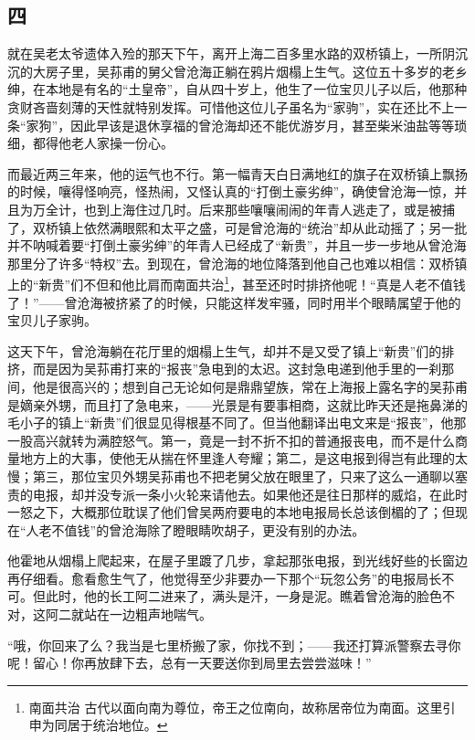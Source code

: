 \subsection*{四}

\par 就在吴老太爷遗体入殓的那天下午，离开上海二百多里水路的双桥镇上，一所阴沉沉的大房子里，吴荪甫的舅父曾沧海正躺在鸦片烟榻上生气。这位五十多岁的老乡绅，在本地是有名的“土皇帝”，自从四十岁上，他生了一位宝贝儿子以后，他那种贪财吝啬刻薄的天性就特别发挥。可惜他这位儿子虽名为“家驹”，实在还比不上一条“家狗”，因此早该是退休享福的曾沧海却还不能优游岁月，甚至柴米油盐等等琐细，都得他老人家操一份心。
\par 而最近两三年来，他的运气也不行。第一幅青天白日满地红的旗子在双桥镇上飘扬的时候，嚷得怪响亮，怪热闹，又怪认真的“打倒土豪劣绅”，确使曾沧海一惊，并且为万全计，也到上海住过几时。后来那些嚷嚷闹闹的年青人逃走了，或是被捕了，双桥镇上依然满眼熙和太平之盛，可是曾沧海的“统治”却从此动摇了；另一批并不呐喊着要“打倒土豪劣绅”的年青人已经成了“新贵”，并且一步一步地从曾沧海那里分了许多“特权”去。到现在，曾沧海的地位降落到他自己也难以相信：双桥镇上的“新贵”们不但和他比肩而南面共治\footnote{南面共治 古代以面向南为尊位，帝王之位南向，故称居帝位为南面。这里引申为同居于统治地位。}，甚至还时时排挤他呢！“真是人老不值钱了！”——曾沧海被挤紧了的时候，只能这样发牢骚，同时用半个眼睛属望于他的宝贝儿子家驹。
\par 这天下午，曾沧海躺在花厅里的烟榻上生气，却并不是又受了镇上“新贵”们的排挤，而是因为吴荪甫打来的“报丧”急电到的太迟。这封急电递到他手里的一刹那间，他是很高兴的；想到自己无论如何是鼎鼎望族，常在上海报上露名字的吴荪甫是嫡亲外甥，而且打了急电来，——光景是有要事相商，这就比昨天还是拖鼻涕的毛小子的镇上“新贵”们很显见得根基不同了。但当他翻译出电文来是“报丧”，他那一股高兴就转为满腔怒气。第一，竟是一封不折不扣的普通报丧电，而不是什么商量地方上的大事，使他无从揣在怀里逢人夸耀；第二，是这电报到得岂有此理的太慢；第三，那位宝贝外甥吴荪甫也不把老舅父放在眼里了，只来了这么一通聊以塞责的电报，却并没专派一条小火轮来请他去。如果他还是往日那样的威焰，在此时一怒之下，大概那位耽误了他们曾吴两府要电的本地电报局长总该倒楣的了；但现在“人老不值钱”的曾沧海除了瞪眼睛吹胡子，更没有别的办法。
\par 他霍地从烟榻上爬起来，在屋子里踱了几步，拿起那张电报，到光线好些的长窗边再仔细看。愈看愈生气了，他觉得至少非要办一下那个“玩忽公务”的电报局长不可。但此时，他的长工阿二进来了，满头是汗，一身是泥。瞧着曾沧海的脸色不对，这阿二就站在一边粗声地喘气。
\par “哦，你回来了么？我当是七里桥搬了家，你找不到；——我还打算派警察去寻你呢！留心！你再放肆下去，总有一天要送你到局里去尝尝滋味！”
